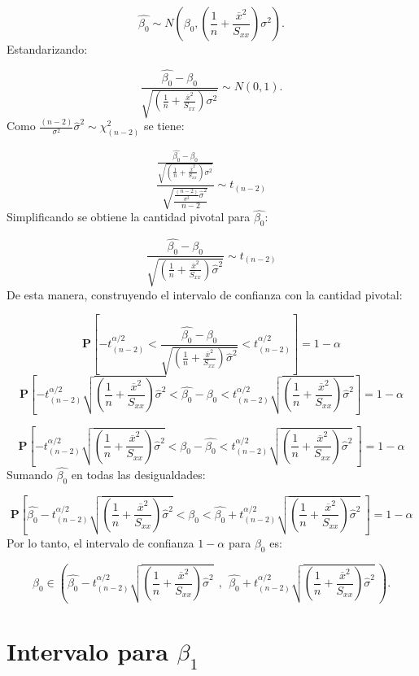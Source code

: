 \documentclass[
  a4paper,
  oneside,
  openany]{book}
\begin{document}
\[\hat{\beta_{0}} \sim N \left( \beta_{0},\left(\frac{1}{n}+\frac{\overline{x}^2}{S_{xx}}\right)\sigma^2\right).\]
Estandarizando:

\[\frac{\hat{\beta_{0}}-\beta_{0}}{\sqrt{\left(\frac{1}{n}+\frac{\overline{x}^2}{S_{xx}}\right)\sigma^2}}\sim N (0,1).\]
Como \(\frac{(n-2)}{\sigma^2}\hat{\sigma}^2\sim\chi^2_{(n-2)}\) se tiene:

\[\frac{\frac{\hat{\beta_{0}}-\beta_{0}}{\sqrt{\left(\frac{1}{n}+\frac{\overline{x}^2}{S_{xx}}\right)\sigma^2}}}{\sqrt{\frac{\frac{(n-2)}{\sigma^2}\hat{\sigma}^2}{n-2}}}\sim t_{(n-2)}\]
Simplificando se obtiene la cantidad pivotal para \(\hat{\beta_{0}}:\)

\[\frac{\hat{\beta_{0}}-\beta_{0}}{\sqrt{\left(\frac{1}{n}+\frac{\overline{x}^2}{S_{xx}}\right)\hat{\sigma}^2}} \sim t_{(n-2)}\]
De esta manera, construyendo el intervalo de confianza con la cantidad pivotal:

\[\mathbf{P}\left[-t^{\alpha/2}_{(n-2)}<\frac{\hat{\beta_{0}}-\beta_{0}}{\sqrt{\left(\frac{1}{n}+\frac{\overline{x}^2}{S_{xx}}\right)\hat{\sigma}^2}}< t^{\alpha/2}_{(n-2)}\right]=1-\alpha\]
\[\mathbf{P}\left[-t^{\alpha/2}_{(n-2)}\sqrt{\left(\frac{1}{n}+\frac{\overline{x}^2}{S_{xx}}\right)\hat{\sigma}^2}<\hat{\beta_{0}}-\beta_{0}< t^{\alpha/2}_{(n-2)}\sqrt{\left(\frac{1}{n}+\frac{\overline{x}^2}{S_{xx}}\right)\hat{\sigma}^2}\right]=1-\alpha\]

\[\mathbf{P}\left[-t^{\alpha/2}_{(n-2)}\sqrt{\left(\frac{1}{n}+\frac{\overline{x}^2}{S_{xx}}\right)\hat{\sigma}^2}<\beta_{0}-\hat{\beta_{0}}< t^{\alpha/2}_{(n-2)}\sqrt{\left(\frac{1}{n}+\frac{\overline{x}^2}{S_{xx}}\right)\hat{\sigma}^2} \ \right]=1-\alpha\]
Sumando \(\hat{\beta_{0}}\) en todas las desigualdades:

\[\mathbf{P}\left[\hat{\beta_{0}}-t^{\alpha/2}_{(n-2)}\sqrt{\left(\frac{1}{n}+\frac{\overline{x}^2}{S_{xx}}\right)\hat{\sigma}^2}<\beta_{0}< \hat{\beta_{0}}+t^{\alpha/2}_{(n-2)}\sqrt{\left(\frac{1}{n}+\frac{\overline{x}^2}{S_{xx}}\right)\hat{\sigma}^2} \ \right]=1-\alpha\]
Por lo tanto, el intervalo de confianza \(1-\alpha\) para \(\beta_{0}\) es:

\[\beta_{0} \in \left( \hat{\beta_{0}}-t^{\alpha/2}_{(n-2)}\sqrt{\left(\frac{1}{n}+\frac{\overline{x}^2}{S_{xx}}\right)\hat{\sigma}^2} \ \ , \ \ \hat{\beta_{0}}+t^{\alpha/2}_{(n-2)}\sqrt{\left(\frac{1}{n}+\frac{\overline{x}^2}{S_{xx}}\right)\hat{\sigma}^2} \  \right).\]

\hypertarget{intervalo-para-beta_1}{%
\section{\texorpdfstring{Intervalo para \(\beta_{1}\)}{Intervalo para \textbackslash beta\_\{1\}}}\label{intervalo-para-beta_1}}
\end{document}
